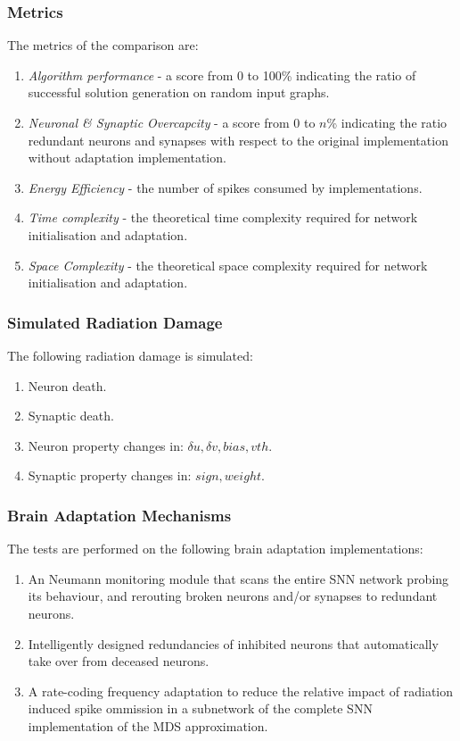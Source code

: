 \subsubsection{Metrics}\label{subsubsec:metrics}
The metrics of the comparison are:
\begin{enumerate}
    \item \textit{Algorithm performance} - a score from 0 to 100\% indicating the ratio of successful solution generation on random input graphs.
    \item \textit{Neuronal \& Synaptic Overcapcity} - a score from 0 to $n$\% indicating the ratio redundant neurons and synapses with respect to the original implementation without adaptation implementation. 
    \item \textit{Energy Efficiency} - the number of spikes consumed by implementations.
    \item \textit{Time complexity} - the theoretical time complexity required for network initialisation and adaptation.
    \item \textit{Space Complexity} - the theoretical space complexity required for network initialisation and adaptation.
\end{enumerate}

\subsubsection{Simulated Radiation Damage}\label{subsubsec:simulated_radiation_damage}
The following radiation damage is simulated:
\begin{enumerate}
    \item Neuron death.
    \item Synaptic death.
    \item Neuron property changes in: $\delta u,\delta v, bias,vth$.
    \item Synaptic property changes in: $sign,weight$.
\end{enumerate}

\subsubsection{Brain Adaptation Mechanisms}\label{subsubsec:brain_adaptation_mechanisms}
The tests are performed on the following brain adaptation implementations:
\begin{enumerate}
    \item An Neumann monitoring module that scans the entire SNN network probing its behaviour, and rerouting broken neurons and/or synapses to redundant neurons.
    \item Intelligently designed redundancies of inhibited neurons that automatically take over from deceased neurons.
    \item A rate-coding frequency adaptation to reduce the relative impact of radiation induced spike ommission in a subnetwork of the complete SNN implementation of the MDS approximation.
\end{enumerate}